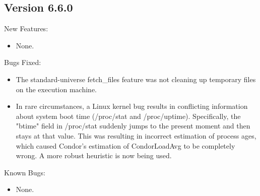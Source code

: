 \subsection{\label{sec:New-6-6-0}Version 6.6.0}

\noindent New Features:

\begin{itemize}

\item None.

\end{itemize}

\noindent Bugs Fixed:

\begin{itemize}

\item The standard-universe fetch_files feature was not cleaning up
temporary files on the execution machine.

\item In rare circumstances, a Linux kernel bug results in conflicting
information about system boot time (/proc/stat and /proc/uptime).
Specifically, the "btime" field in /proc/stat suddenly jumps to
the present moment and then stays at that value.  This
was resulting in incorrect estimation of process ages, which caused
Condor's estimation of CondorLoadAvg to be completely wrong.  A more
robust heuristic is now being used.

\end{itemize}

\noindent Known Bugs:

\begin{itemize}

\item None.

\end{itemize}


